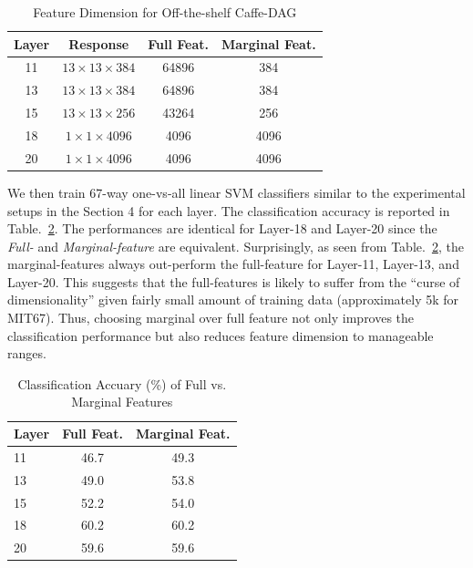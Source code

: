 \documentclass[10pt,twocolumn,letterpaper]{article}
\begin{document}
\begin{table}[htbp]
\begin{center}
\begin{tabular}{|c|c|c|c|}
\hline
Layer & Response &  Full Feat.& Marginal Feat.\\
\hline
11 & $13\times 13 \times 384$ & 64896 & 384 \\
13 & $13\times 13 \times 384$ & 64896 & 384 \\
15 & $13\times 13 \times 256$ & 43264 & 256 \\
18 & $1\times 1 \times 4096$ & 4096 & 4096 \\
20 & $1\times 1 \times 4096$ & 4096 & 4096 \\

\hline
\end{tabular}
\end{center}
\caption{Feature Dimension for Off-the-shelf Caffe-DAG}
\label{table:feat_dim}
\end{table}

We then train 67-way one-vs-all linear SVM classifiers similar to the experimental setups in the Section 4 for each layer. The classification accuracy is reported in Table.~\ref{table:perf_full}. The performances are identical for Layer-18 and Layer-20 since the \textit{Full-} and \textit{Marginal-feature} are equivalent. Surprisingly, as seen from Table.~\ref{table:perf_full}, the marginal-features always out-perform the full-feature for Layer-11, Layer-13, and Layer-20. This suggests that the full-features is likely to suffer from the ``curse of dimensionality'' given fairly small amount of training data (approximately 5k for MIT67). Thus, choosing marginal over full feature not only improves the classification performance but also reduces feature dimension to manageable ranges. 


\begin{table}[htbp]
\begin{center}
\begin{tabular}{|l|c|c|}
\hline
Layer & Full Feat. & Marginal Feat. \\
\hline
11 & 46.7 & 49.3  \\
13 & 49.0 & 53.8  \\
15 & 52.2 & 54.0  \\
18 & 60.2 & 60.2  \\
20 & 59.6 & 59.6  \\

\hline
\end{tabular}
\end{center}
\caption{Classification Accuary (\%) of Full vs. Marginal Features}
\label{table:perf_full}
\end{table}
\end{document}
